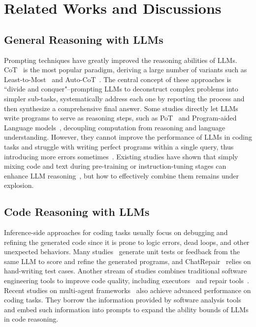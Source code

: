 \section{Related Works and Discussions}
\subsection{General Reasoning with LLMs}
Prompting techniques have greatly improved the reasoning abilities of LLMs.
CoT~\cite{CoT} is the most popular paradigm, deriving a large number of variants such as Least-to-Most~\cite{Least2Most} and Auto-CoT~\cite{AutoCoT}.
The central concept of these approaches is ``divide and conquer"--prompting LLMs to deconstruct complex problems into simpler sub-tasks, systematically address each one by reporting the process and then synthesize a comprehensive final answer.
Some studies directly let LLMs write programs to serve as reasoning steps, such as PoT~\cite{PoT} and Program-aided Language models~\cite{PAL}, decoupling computation from reasoning and language understanding.
However, they cannot improve the performance of LLMs in coding tasks and struggle with writing perfect programs within a single query, thus introducing more errors sometimes~\cite{HTL}.
Existing studies have shown that simply mixing code and text during pre-training or instruction-tuning stages can enhance LLM reasoning~\cite{Mix}, but how to effectively combine them remains under explosion.

\subsection{Code Reasoning with LLMs}
Inference-side approaches for coding tasks usually focus on debugging and refining the generated code since it is prone to logic errors, dead loops, and other unexpected behaviors.
Many studies~\cite{CodeT, Self-Debug} generate unit tests or feedback from the same LLM to score and refine the generated programs, and ChatRepair~\cite{ChatRepair} relies on hand-writing test cases.
Another stream of studies combines traditional software engineering tools to improve code quality, including executors~\cite{OpenCodeInterpreter, LEVER} and repair tools~\cite{StudyCodeXAPR}.
Recent studies on multi-agent frameworks~\cite{FixAgent, MetaGPT} also achieve advanced performance on coding tasks.
They borrow the information provided by software analysis tools and embed such information into prompts to expand the ability bounds of LLMs in code reasoning.

